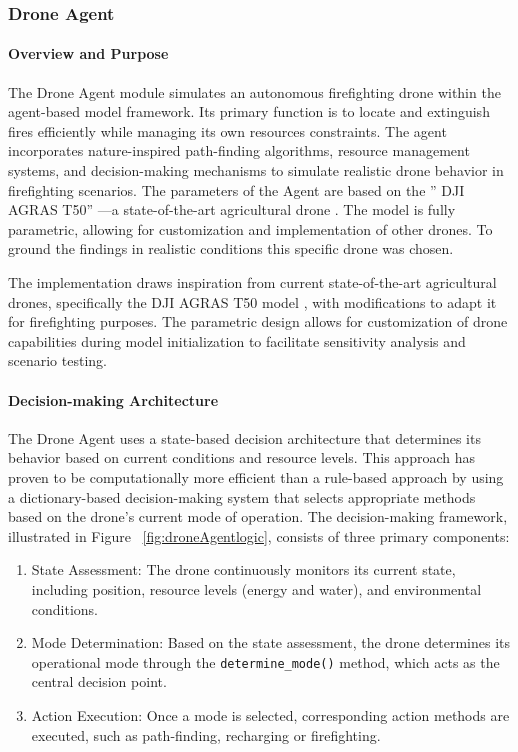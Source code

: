 \documentclass[11pt, a4paper]{article}
\begin{document}
\subsubsection{Drone Agent}
\label{sec:DroneAgent}

\paragraph{Overview and Purpose} The Drone Agent module simulates an autonomous firefighting drone within the agent-based model framework. Its primary function is to locate and extinguish fires efficiently while managing its own resources constraints. The agent incorporates nature-inspired path-finding algorithms, resource management systems, and decision-making mechanisms to simulate realistic drone behavior in firefighting scenarios.
The parameters of the Agent are based on the '' DJI AGRAS T50'' —a state-of-the-art agricultural drone \citep{DJIAGRAST50}. The model is fully parametric, allowing for customization and implementation of other drones. To ground the findings in realistic conditions this specific drone was chosen.

The implementation draws inspiration from current state-of-the-art agricultural drones, specifically the DJI AGRAS T50 model \citep{DJIAGRAST50}, with modifications to adapt it for firefighting purposes. The parametric design allows for customization of drone capabilities during model initialization to facilitate sensitivity analysis and scenario testing.

\paragraph{Decision-making Architecture} The Drone Agent uses a state-based decision architecture that determines its behavior based on current conditions and resource levels. This approach has proven to be computationally more efficient than a rule-based approach by using a dictionary-based decision-making system that selects appropriate methods based on the drone's current mode of operation.
The decision-making framework, illustrated in Figure ~\ref{fig:droneAgentlogic}, consists of three primary components:
\begin{enumerate}
  \item {State Assessment:} The drone continuously monitors its current state, including position, resource levels (energy and water), and environmental conditions.
  
  \item{Mode Determination:} Based on the state assessment, the drone determines its operational mode through the \texttt{determine\_mode()} method, which acts as the central decision point.
  
  \item {Action Execution:} Once a mode is selected, corresponding action methods are executed, such as path-finding, recharging or firefighting.

\end{enumerate}
\end{document}
